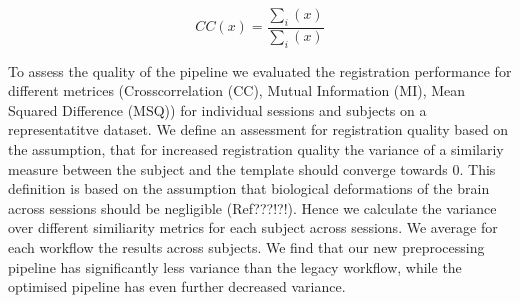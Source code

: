 \[ CC(x) = \frac{\sum_i{(x)}}{\sum_i{(x)}} \]


To assess the quality of the pipeline we evaluated the registration performance for different metrices (Crosscorrelation (CC), Mutual Information (MI), Mean Squared Difference (MSQ)) for individual sessions and subjects on a representatitve dataset.
We define an assessment for registration quality based on the assumption, that for increased registration quality the variance of a similariy measure between the subject and the template should converge towards 0.
This definition is based on the assumption that biological deformations of the brain across sessions should be negligible (Ref???!?!).
Hence we calculate the variance over different similiarity metrics for each subject across sessions.
We average for each workflow the results across subjects.
We find that our new preprocessing pipeline has significantly less variance than the legacy workflow, while the optimised pipeline has even further decreased variance.

